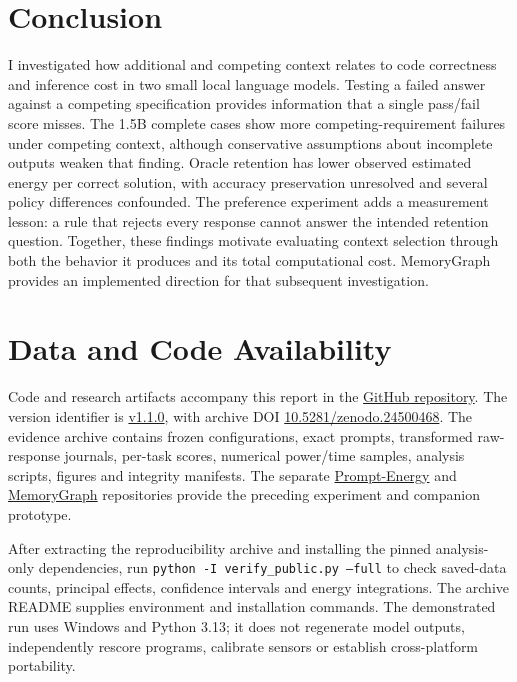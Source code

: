 \documentclass[10pt,a4paper,twocolumn]{article}
\begin{document}
\section{Conclusion}
I investigated how additional and competing context relates to code correctness
and inference cost in two small local language models. Testing a failed answer
against a competing specification provides information that a single pass/fail
score misses. The 1.5B complete cases show more competing-requirement failures
under competing context, although conservative assumptions about incomplete
outputs weaken that finding. Oracle retention has lower observed estimated
energy per correct solution, with accuracy preservation unresolved and several
policy differences confounded. The preference experiment adds a measurement
lesson: a rule that rejects every response cannot answer the intended retention
question. Together, these findings motivate evaluating context selection through
both the behavior it produces and its total computational cost. MemoryGraph
provides an implemented direction for that subsequent investigation.

\section{Data and Code Availability}
\begingroup\RaggedRight
Code and research artifacts accompany this report in the
\href{https://github.com/buildgit17626-ctrl/Memory-Under-Interference-}{GitHub repository}.
The version identifier is
\href{https://github.com/buildgit17626-ctrl/Memory-Under-Interference-/releases/tag/v1.1.0}{v1.1.0},
with archive DOI
\href{https://doi.org/10.5281/zenodo.24500468}{10.5281/zenodo.24500468}.
The evidence archive contains frozen configurations, exact prompts, transformed
raw-response journals, per-task scores, numerical power/time samples, analysis
scripts, figures and integrity manifests. The separate
\href{https://github.com/buildgit17626-ctrl/Prompt-Energy}{Prompt-Energy} and
\href{https://github.com/buildgit17626-ctrl/MemoryGraph}{MemoryGraph}
repositories provide the preceding experiment and companion prototype.

After extracting the reproducibility archive and installing the pinned
analysis-only dependencies, run \texttt{python -I verify\_public.py --full}
to check saved-data counts, principal effects, confidence intervals and energy
integrations. The archive README supplies environment and installation commands.
The demonstrated run uses Windows and Python 3.13; it does not regenerate model
outputs, independently rescore programs, calibrate sensors or establish
cross-platform portability.
\end{document}
